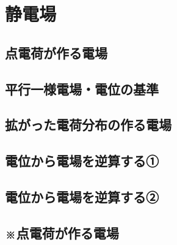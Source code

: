\documentclass[../../../all/physics-standard_answers_all.tex]{subfiles}
\begin{document}
\section{静電場}

\subsection{点電荷が作る電場}
    

    \vspace{1cm}
    \vfill

\subsection{平行一様電場・電位の基準}
    

    \vspace{1cm}
    \vfill

\subsection{拡がった電荷分布の作る電場}
    

    \vspace{1cm}
    \vfill

\subsection{電位から電場を逆算する①}
    

    \vspace{1cm}
    \vfill

\subsection{電位から電場を逆算する②}
    

    \vspace{1cm}
    \vfill

\subsection{※点電荷が作る電場}
    
\end{document}
